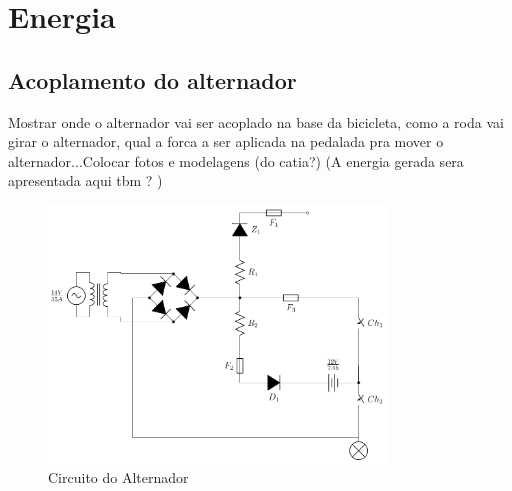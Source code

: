 \chapter{Energia}
\label{energia}


\section{Acoplamento do alternador}
Mostrar onde o alternador vai ser acoplado na base da bicicleta, como a roda vai girar o alternador, qual a forca a ser aplicada na pedalada pra mover o alternador...Colocar fotos e modelagens (do catia?)
(A energia gerada sera apresentada aqui tbm ? )


\begin{figure}[h]
  \centering
	\includegraphics[width=0.8\textwidth]{figuras/alternadorCircuito}
  \caption{Circuito do Alternador}
  \label{fig:figuras_alternadorcircuito}
\end{figure}





